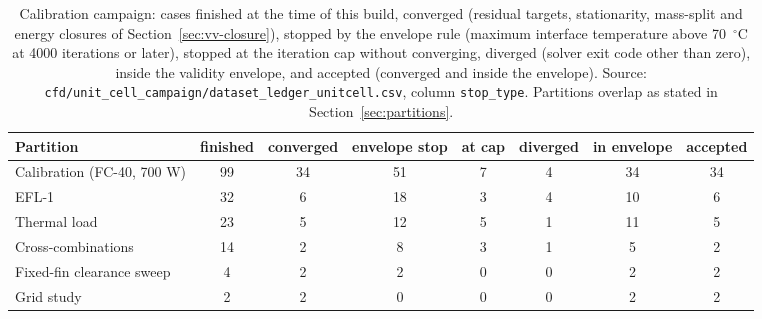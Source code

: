 \begin{table}[htbp]
\centering
\caption{Calibration campaign: cases finished at the time of this build, converged (residual targets, stationarity, mass-split and energy closures of Section~\ref{sec:vv-closure}), stopped by the envelope rule (maximum interface temperature above 70~$^{\circ}$C at 4000 iterations or later), stopped at the iteration cap without converging, diverged (solver exit code other than zero), inside the validity envelope, and accepted (converged and inside the envelope). Source: \texttt{cfd/unit\_cell\_campaign/dataset\_ledger\_unitcell.csv}, column \texttt{stop\_type}. Partitions overlap as stated in Section~\ref{sec:partitions}.}
\label{tab:campaign_counts}
\scriptsize
\begin{tabular}{@{}lccccccc@{}}
\hline
Partition & finished & converged & envelope stop & at cap & diverged & in envelope & accepted \\
\hline
Calibration (FC-40, 700 W) & 99 & 34 & 51 & 7 & 4 & 34 & 34 \\
EFL-1 & 32 & 6 & 18 & 3 & 4 & 10 & 6 \\
Thermal load & 23 & 5 & 12 & 5 & 1 & 11 & 5 \\
Cross-combinations & 14 & 2 & 8 & 3 & 1 & 5 & 2 \\
Fixed-fin clearance sweep & 4 & 2 & 2 & 0 & 0 & 2 & 2 \\
Grid study & 2 & 2 & 0 & 0 & 0 & 2 & 2 \\
\hline
\end{tabular}
\end{table}
